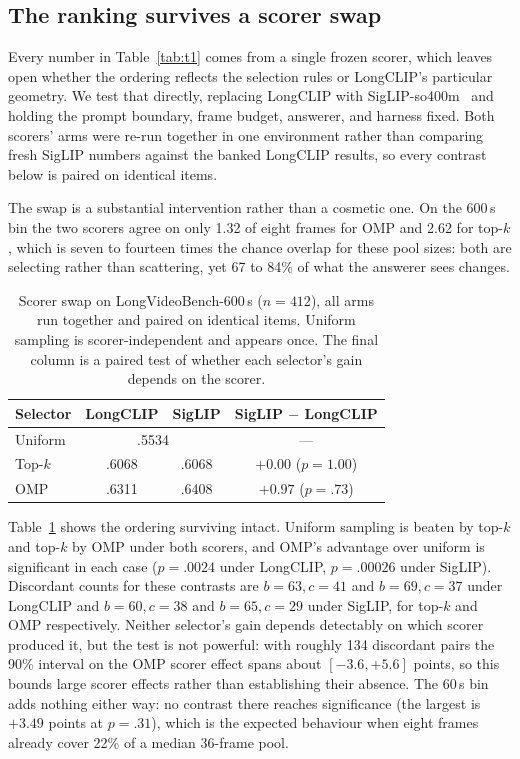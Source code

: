 \documentclass[11pt]{article}
\begin{document}
\subsection{The ranking survives a scorer swap}
\label{sec:scorer}

Every number in Table~\ref{tab:t1} comes from a single frozen scorer, which leaves open whether the ordering reflects the selection rules or LongCLIP's particular geometry.
We test that directly, replacing LongCLIP with SigLIP-so400m~\citep{zhai2023siglip} and holding the prompt boundary, frame budget, answerer, and harness fixed.
Both scorers' arms were re-run together in one environment rather than comparing fresh SigLIP numbers against the banked LongCLIP results, so every contrast below is paired on identical items.

The swap is a substantial intervention rather than a cosmetic one.
On the 600\,s bin the two scorers agree on only 1.32 of eight frames for OMP and 2.62 for top-$k$, which is seven to fourteen times the chance overlap for these pool sizes: both are selecting rather than scattering, yet 67 to 84\% of what the answerer sees changes.

\begin{table}[t]
\centering
\small
\begin{tabular}{lccc}
\toprule
Selector & LongCLIP & SigLIP & SigLIP $-$ LongCLIP \\
\midrule
Uniform & \multicolumn{2}{c}{.5534} & --- \\
Top-$k$ & .6068 & .6068 & ${+}0.00$ ($p{=}1.00$) \\
OMP & .6311 & .6408 & ${+}0.97$ ($p{=}.73$) \\
\bottomrule
\end{tabular}
\caption{Scorer swap on LongVideoBench-600\,s ($n{=}412$), all arms run together and paired on identical items. Uniform sampling is scorer-independent and appears once. The final column is a paired test of whether each selector's gain depends on the scorer.}
\label{tab:scorer}
\end{table}

Table~\ref{tab:scorer} shows the ordering surviving intact.
Uniform sampling is beaten by top-$k$ and top-$k$ by OMP under both scorers, and OMP's advantage over uniform is significant in each case ($p{=}.0024$ under LongCLIP, $p{=}.00026$ under SigLIP).
Discordant counts for these contrasts are $b{=}63,c{=}41$ and $b{=}69,c{=}37$ under LongCLIP and $b{=}60,c{=}38$ and $b{=}65,c{=}29$ under SigLIP, for top-$k$ and OMP respectively.
Neither selector's gain depends detectably on which scorer produced it, but the test is not powerful: with roughly 134 discordant pairs the 90\% interval on the OMP scorer effect spans about $[-3.6,+5.6]$ points, so this bounds large scorer effects rather than establishing their absence.
The 60\,s bin adds nothing either way: no contrast there reaches significance (the largest is ${+}3.49$ points at $p{=}.31$), which is the expected behaviour when eight frames already cover 22\% of a median 36-frame pool.
\end{document}
